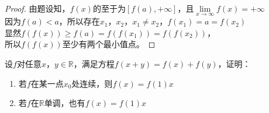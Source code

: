\begin{proof}
    
    由题设知，$f(x)$的至于为$[f(a),+\infty]$，且$\lim\limits_{x\to\infty}{f(x)}=+\infty$\\
    因为$f(a)<a$，所以存在$x_1$，$x_2$，$x_1 \neq x_2$，$f(x_1) = a = f(x_2)$\\
    显然$f(f(x))\geq f(a) = f(f(x_1)) = f(f(x_2))$，\\
    所以$f(f(x))$至少有两个最小值点。

\end{proof}

\begin{proposition}[Cauthy方程]
    
    设$f$对任意$x$，$y \in \mathbb{R}$，满足方程$f(x+y) = f(x) + f(y)$，证明：

    \begin{enumerate}

        \item 若$f$在某一点$x_0$处连续，则$f(x) = f(1)x$
        
        \item 若$f$在$\mathbb{R}$单调，也有$f(x) = f(1)x$
        
    \end{enumerate}

\end{proposition}

